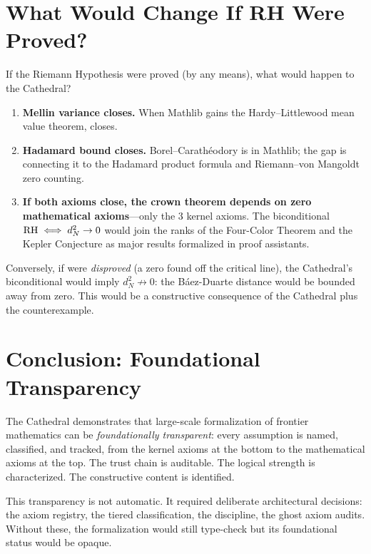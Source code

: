 \documentclass[11pt,a4paper]{article}
\begin{document}
\section{What Would Change If RH Were Proved?}
\label{sec:if}

If the Riemann Hypothesis were proved (by any means), what would
happen to the Cathedral?

\begin{enumerate}
  \item \textbf{Mellin variance closes.} When Mathlib gains the
    Hardy--Littlewood mean value theorem,
     closes.
  \item \textbf{Hadamard bound closes.} Borel--Carath\'eodory is in
    Mathlib; the gap is connecting it to the Hadamard product formula
    and Riemann--von Mangoldt zero counting.
  \item \textbf{If both axioms close, the crown theorem depends on
    zero mathematical axioms}---only the 3 kernel axioms. The
    biconditional $\mathrm{RH} \iff d_N^2 \to 0$ would join the ranks of the
    Four-Color Theorem and the Kepler Conjecture as major results
    formalized in proof assistants.
\end{enumerate}

Conversely, if \RH{} were \emph{disproved} (a zero found off the
critical line), the Cathedral's biconditional would imply
$d_N^2 \not\to 0$: the B\'aez-Duarte distance would be bounded
away from zero. This would be a constructive consequence of the
Cathedral plus the counterexample.

\section{Conclusion: Foundational Transparency}

The Cathedral demonstrates that large-scale formalization of frontier
mathematics can be \emph{foundationally transparent}: every assumption
is named, classified, and tracked, from the kernel axioms at the
bottom to the mathematical axioms at the top. The trust chain is
auditable. The logical strength is characterized. The constructive
content is identified.

This transparency is not automatic. It required deliberate
architectural decisions: the axiom registry, the tiered classification,
the  discipline, the ghost axiom audits. Without
these, the formalization would still type-check but its foundational
status would be opaque.
\end{document}

